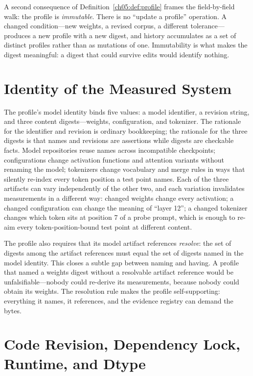 A second consequence of Definition~\ref{ch05:def:profile} frames the
field-by-field walk: the profile is \emph{immutable}. There is no
``update a profile'' operation. A changed condition---new weights, a revised
corpus, a different tolerance---produces a new profile with a new digest,
and history accumulates as a set of distinct profiles rather than as
mutations of one. Immutability is what makes the digest meaningful: a digest
that could survive edits would identify nothing.

\section{Identity of the Measured System}\label{ch05:model}

The profile's model identity binds five values: a model identifier, a
revision string, and three content digests---weights, configuration, and
tokenizer. The rationale for the identifier and revision is ordinary
bookkeeping; the rationale for the three digests is that names and revisions
are assertions while digests are checkable facts. Model repositories reuse
names across incompatible checkpoints; configurations change activation
functions and attention variants without renaming the model; tokenizers
change vocabulary and merge rules in ways that silently re-index every token
position a test point names. Each of the three artifacts can vary
independently of the other two, and each variation invalidates measurements
in a different way: changed weights change every activation; a changed
configuration can change the meaning of ``layer 12''; a changed tokenizer
changes which token sits at position 7 of a probe prompt, which is enough to
re-aim every token-position-bound test point at different content.

The profile also requires that its model artifact references \emph{resolve}:
the set of digests among the artifact references must equal the set of
digests named in the model identity. This closes a subtle gap between
naming and having. A profile that named a weights digest without a
resolvable artifact reference would be unfalsifiable---nobody could re-derive
its measurements, because nobody could obtain its weights. The resolution
rule makes the profile self-supporting: everything it names, it references,
and the evidence registry can demand the bytes.

\section{Code Revision, Dependency Lock, Runtime, and Dtype}\label{ch05:code}

